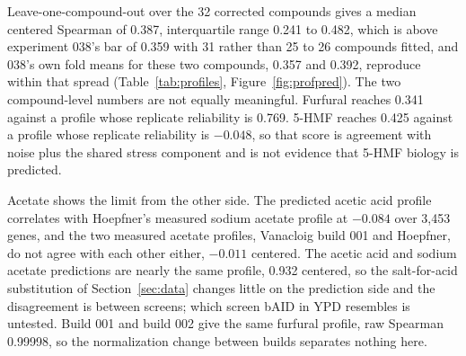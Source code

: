  Leave-one-compound-out over the 32 corrected
compounds gives a median centered Spearman of 0.387, interquartile range 0.241 to 0.482,
which is above experiment 038's bar of 0.359 with 31 rather than 25 to 26 compounds
fitted, and 038's own fold means for these two compounds, 0.357 and 0.392, reproduce
within that spread (Table~\ref{tab:profiles}, Figure~\ref{fig:profpred}). The two
compound-level numbers are not equally meaningful. Furfural reaches 0.341 against a
profile whose replicate reliability is 0.769. 5-HMF reaches 0.425 against a profile whose
replicate reliability is $-0.048$, so that score is agreement with noise plus the shared
stress component and is not evidence that 5-HMF biology is predicted.

Acetate shows the limit from the other side. The predicted acetic acid profile correlates
with Hoepfner's measured sodium acetate profile at $-0.084$ over 3,453 genes, and the two
measured acetate profiles, Vanacloig build 001 and Hoepfner, do not agree with each other
either, $-0.011$ centered. The acetic acid and sodium acetate predictions are nearly the
same profile, 0.932 centered, so the salt-for-acid substitution of
Section~\ref{sec:data} changes little on the prediction side and the disagreement is
between screens; which screen bAID in YPD resembles is untested. Build 001 and build 002
give the same furfural profile, raw Spearman 0.99998, so the normalization change between
builds separates nothing here.

\begin{table}[htbp]
\centering
\footnotesize
\caption[]{Compound-cold profile checks. Centering subtracts each gene's mean over the 32
build-002 compounds, which removes the component every compound shares, so the centered
column is the compound-specific agreement and the raw column is inflated by that shared
part. A score against a profile whose replicate reliability is near or below zero is a
score against noise.}
\label{tab:profiles}

\end{table}


